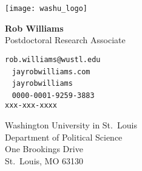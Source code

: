 \documentclass[10pt]{article}
\begin{document}
	

\texttt{[image: washu\_logo]}%
\hspace{0mm}
\parbox{2in}{
	\vspace{-18mm}
    \textbf{Rob Williams} \\
    Postdoctoral Research Associate
}

\vspace{-4mm}
\hspace{12mm}
\parbox{2in}{
	
	\faEnvelope \hspace{.65mm} \texttt{rob.williams@wustl.edu} \\
	\faGlobe ~ \texttt{jayrobwilliams.com} \\
	\faGithub ~ \texttt{jayrobwilliams} \\
	\aiOrcid ~ \texttt{0000-0001-9259-3883} \\
	\faPhone \hspace{1.30mm} \texttt{xxx-xxx-xxxx}
}

\vspace{3mm}
\hspace{12mm}
\parbox{2.5in}{
	\small
	\textsf{\textcolor{uncblue}{Washington University in St.\ Louis}}\\
	\scriptsize Department of Political Science \\
	One Brookings Drive \\
	St.\ Louis, MO 63130
}
\end{document}

